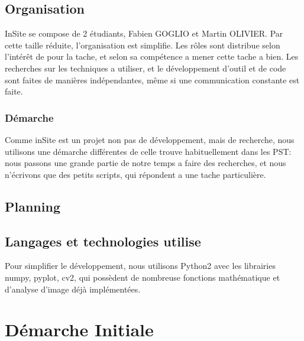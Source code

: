 \documentclass[a4paper, 12pt, titlepage, oneside, french]{article}
\begin{document}
	\subsection{Organisation}
	InSite se compose de 2 étudiants, Fabien GOGLIO et Martin OLIVIER. Par cette taille réduite, l'organisation est simplifie. Les rôles sont distribue selon l'intérêt de pour la tache, et selon sa compétence a mener cette tache a bien. Les recherches sur les techniques a utiliser, et le développement d'outil et de code sont faites de manières indépendantes, même si une communication constante est faite. 
	\subsubsection{Démarche}
	Comme inSite est un projet non pas de développement, mais de recherche, nous utilisons une démarche différentes de celle trouve habituellement dans les PST: nous passons une grande partie de notre temps a faire des recherches, et nous n'écrivons que des petits scripts, qui répondent a une tache particulière.   
	\subsection{Planning}
	\subsection{Langages et technologies utilise}
	Pour simplifier le développement, nous utilisons Python2 avec les librairies numpy, pyplot, cv2, qui possèdent de nombreuse fonctions mathématique et d'analyse d'image déjà implémentées.
	\newpage

\section{Démarche Initiale}
	
\end{document}
